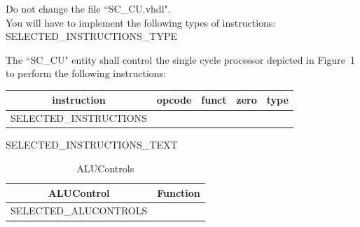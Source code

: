 \documentclass[a4paper,12pt]{article}
\newcommand\Tstrut{\rule{0pt}{2.6ex}}       %
\begin{document}
Do not change the file ``SC\_CU.vhdl".\\

You will have to implement the following types of instructions:
{{SELECTED_INSTRUCTIONS_TYPE}}

The ``SC\_CU" entity shall control the single cycle processor depicted in  Figure~1 to perform the following instructions:

\begin{table}[h!]
\centering
    \begin{tabular}{|c|c|c|c|c|} \hline \Tstrut
		instruction & opcode  & funct	& zero & type   \\ \hline \Tstrut
		{{SELECTED_INSTRUCTIONS}}
    \hline
    \end{tabular}
\end{table}

{{SELECTED_INSTRUCTIONS_TEXT}}

\begin{table}[h!]
\centering
    \begin{tabular}{|c|c|} \hline \Tstrut
		ALUControl & Function   \\ \hline \Tstrut
		{{SELECTED_ALUCONTROLS}}
    \hline
    \end{tabular}
    \caption{ALUControls}
    \label{tab:ALUControls}
\end{table}
\end{document}
